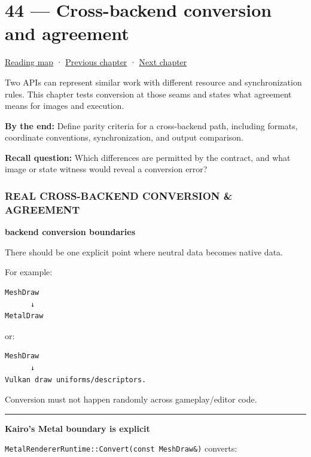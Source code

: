 \hypertarget{06-engine-ii-ch044}{}
\section{44 --- Cross-backend conversion and agreement}\label{cross-backend-conversion-and-agreement}

\href{Chapter\%20Edition/03\%20-\%20Game\%20Engine/00\%20-\%20Reading\%20Map}{Reading map} · \hyperref[06-engine-ii-ch043]{Previous chapter} · \hyperref[06-engine-ii-ch045]{Next chapter}

Two APIs can represent similar work with different resource and synchronization rules. This chapter tests conversion at those seams and states what agreement means for images and execution.

\textbf{By the end:} Define parity criteria for a cross-backend path, including formats, coordinate conventions, synchronization, and output comparison.

\textbf{Recall question:} Which differences are permitted by the contract, and what image or state witness would reveal a conversion error?

\subsubsection{REAL CROSS-BACKEND CONVERSION \& AGREEMENT}\label{real-cross-backend-conversion-agreement}

\textbf{backend conversion boundaries}

There should be one explicit point where neutral data becomes native data.

For example:

\begin{verbatim}
MeshDraw
      ↓
MetalDraw
\end{verbatim}

or:

\begin{verbatim}
MeshDraw
      ↓
Vulkan draw uniforms/descriptors.
\end{verbatim}

Conversion must not happen randomly across gameplay/editor code.

\begin{center}\rule{0.5\linewidth}{0.5pt}\end{center}

\textbf{Kairo's Metal boundary is explicit}

\texttt{MetalRendererRuntime::Convert(const\ MeshDraw\&)} converts:

